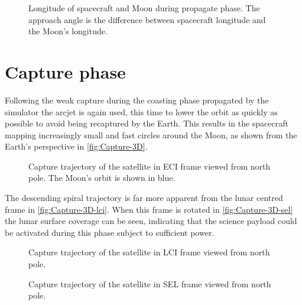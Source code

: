 \begin{figure}
\centering
\def\svgwidth{\figurewidth}

\caption{Longitude of spacecraft and Moon during propagate phase. The approach angle is the difference between spacecraft longitude and the Moon's longitude.} \label{fig:Propagate-phase}
\end{figure}


\clearpage


\section{Capture phase} \label{sec:Capture}

Following the weak capture during the coasting phase propagated by the simulator the arcjet is again used, this time to lower the orbit as quickly as possible to avoid being recaptured by the Earth. This results in the spacecraft mapping increasingly small and fast circles around the Moon, as shown from the Earth's perspective in \autoref{fig:Capture-3D}.

\begin{figure}[h]
\centering
\def\svgwidth{\figurewidth}

\caption{Capture trajectory of the satellite in ECI frame viewed from north pole. The Moon's orbit is shown in blue.} \label{fig:Capture-3D}
\end{figure}

The descending spiral trajectory is far more apparent from the lunar centred frame in \autoref{fig:Capture-3D-lci}. When this frame is rotated in \autoref{fig:Capture-3D-sel} the lunar surface coverage can be seen, indicating that the science payload could be activated during this phase subject to sufficient power.

\begin{figure}
\centering
\def\svgwidth{\figurewidth}

\caption{Capture trajectory of the satellite in LCI frame viewed from north pole.} \label{fig:Capture-3D-lci}
\end{figure}

\begin{figure}
\centering
\def\svgwidth{\figurewidth}

\caption{Capture trajectory of the satellite in SEL frame viewed from north pole.} \label{fig:Capture-3D-sel}
\end{figure}

